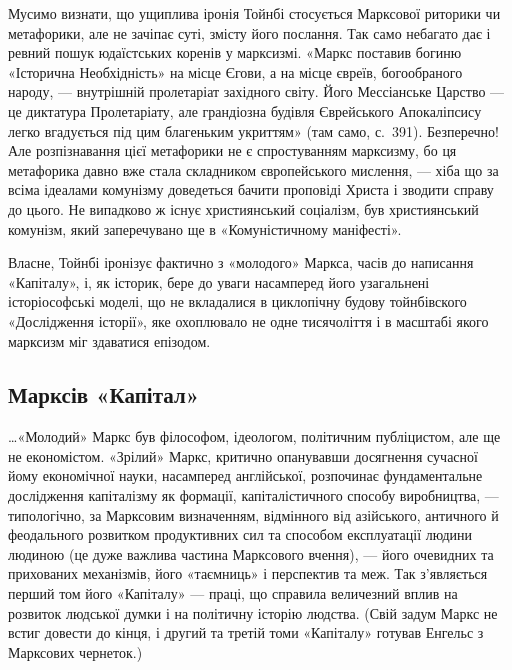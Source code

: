 Мусимо визнати, що ущиплива іронія Тойнбі стосується Марксової 
риторики чи метафорики, але не зачіпає суті, змісту його послання. Так 
само небагато дає і ревний пошук юдаїстських коренів у марксизмі. 
«Маркс поставив богиню «Історична Необхідність» на місце Єгови, а на 
місце євреїв, богообраного народу, — внутрішній пролетаріат 
західного світу. Його Мессіанське Царство — це диктатура 
Пролетаріату, але грандіозна будівля Єврейського Апокаліпсису легко 
вгадується під цим благеньким укриттям» (там само, с.~391). Безперечно! 
Але розпізнавання цієї метафорики не є спростуванням марксизму, бо ця 
метафорика давно вже стала складником європейського мислення, — хіба 
що за всіма ідеалами комунізму доведеться бачити проповіді Христа і 
зводити справу до цього. Не випадково ж існує християнський соціалізм, 
був християнський комунізм, який заперечувано ще в «Комуністичному 
маніфесті». 


Власне, Тойнбі іронізує фактично з «молодого» Маркса, часів до 
написання «Капіталу», і, як історик, бере до уваги насамперед його 
узагальнені історіософські моделі, що не вкладалися в циклопічну 
будову тойнбівского «Дослідження історії», яке охоплювало не одне 
тисячоліття і в масштабі якого марксизм міг здаватися епізодом.


\subsection*{Марксів «Капітал»}


\ldots{}«Молодий» Маркс був філософом, ідеологом, політичним публіцистом, 
але ще не економістом. «Зрілий» Маркс, критично опанувавши досягнення 
сучасної йому економічної науки, насамперед англійської, розпочинає 
фундаментальне дослідження капіталізму як формації, 
капіталістичного способу виробництва, — типологічно, за Марксовим 
визначенням, відмінного від азійського, античного й феодального 
розвитком продуктивних сил та способом експлуатації людини людиною 
(це дуже важлива частина Марксового вчення), — його очевидних та 
прихованих механізмів, його «таємниць» і перспектив та меж. Так 
з'являється перший том його «Капіталу» — праці, що справила 
величезний вплив на розвиток людської думки і на політичну історію 
людства. (Свій задум Маркс не встиг довести до кінця, і другий та третій 
томи «Капіталу» готував Енгельс з Марксових чернеток.)  


